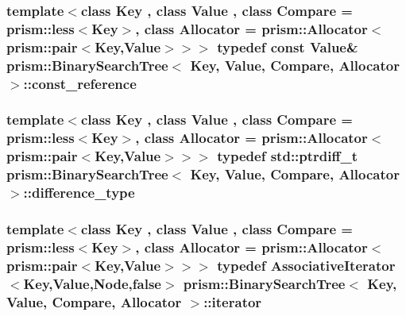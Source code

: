 \subsubsection[{\texorpdfstring{const\+\_\+reference}{const_reference}}]{\setlength{\rightskip}{0pt plus 5cm}template$<$class Key , class Value , class Compare  = prism\+::less$<$\+Key$>$, class Allocator  = prism\+::\+Allocator$<$prism\+::pair$<$\+Key,\+Value$>$$>$$>$ typedef const Value\& {\bf prism\+::\+Binary\+Search\+Tree}$<$ Key, Value, Compare, {\bf Allocator} $>$\+::{\bf const\+\_\+reference}}\hypertarget{classprism_1_1_binary_search_tree_aab75e547e4f5dd8e7f1518ec7b200937}{}\label{classprism_1_1_binary_search_tree_aab75e547e4f5dd8e7f1518ec7b200937}
\subsubsection[{\texorpdfstring{difference\+\_\+type}{difference_type}}]{\setlength{\rightskip}{0pt plus 5cm}template$<$class Key , class Value , class Compare  = prism\+::less$<$\+Key$>$, class Allocator  = prism\+::\+Allocator$<$prism\+::pair$<$\+Key,\+Value$>$$>$$>$ typedef std\+::ptrdiff\+\_\+t {\bf prism\+::\+Binary\+Search\+Tree}$<$ Key, Value, Compare, {\bf Allocator} $>$\+::{\bf difference\+\_\+type}}\hypertarget{classprism_1_1_binary_search_tree_a9f97bb0b22c20eb1f8aff1719ad0e795}{}\label{classprism_1_1_binary_search_tree_a9f97bb0b22c20eb1f8aff1719ad0e795}
\subsubsection[{\texorpdfstring{iterator}{iterator}}]{\setlength{\rightskip}{0pt plus 5cm}template$<$class Key , class Value , class Compare  = prism\+::less$<$\+Key$>$, class Allocator  = prism\+::\+Allocator$<$prism\+::pair$<$\+Key,\+Value$>$$>$$>$ typedef {\bf Associative\+Iterator}$<$Key,Value,{\bf Node},false$>$ {\bf prism\+::\+Binary\+Search\+Tree}$<$ Key, Value, Compare, {\bf Allocator} $>$\+::{\bf iterator}}\hypertarget{classprism_1_1_binary_search_tree_a8c8deaa4e3617d5833c20970ffaa0348}{}\label{classprism_1_1_binary_search_tree_a8c8deaa4e3617d5833c20970ffaa0348}
